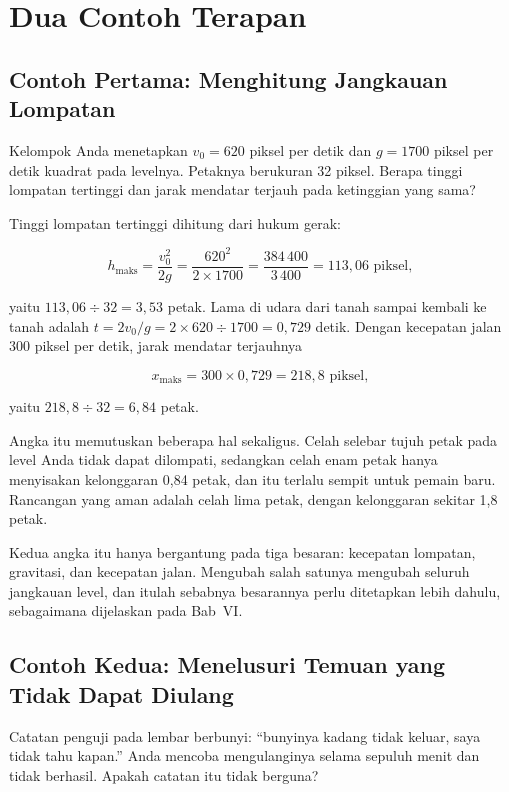 \section{Dua Contoh Terapan}
\label{sec:contoh-bab-16}

\subsection{Contoh Pertama: Menghitung Jangkauan Lompatan}

\begin{contohbox}
Kelompok Anda menetapkan $v_0 = 620$ piksel per detik dan $g = 1700$ piksel
per detik kuadrat pada levelnya. Petaknya berukuran 32 piksel. Berapa tinggi
lompatan tertinggi dan jarak mendatar terjauh pada ketinggian yang sama?
\end{contohbox}

Tinggi lompatan tertinggi dihitung dari hukum gerak:

\[
h_{\text{maks}} = \frac{v_0^2}{2g} = \frac{620^2}{2 \times 1700}
= \frac{384\,400}{3\,400} = 113{,}06 \text{ piksel},
\]

yaitu $113{,}06 \div 32 = 3{,}53$ petak. Lama di udara dari tanah sampai
kembali ke tanah adalah $t = 2v_0 / g = 2 \times 620 \div 1700 = 0{,}729$
detik. Dengan kecepatan jalan 300 piksel per detik, jarak mendatar terjauhnya

\[
x_{\text{maks}} = 300 \times 0{,}729 = 218{,}8 \text{ piksel},
\]

yaitu $218{,}8 \div 32 = 6{,}84$ petak.

Angka itu memutuskan beberapa hal sekaligus. Celah selebar tujuh petak pada
level Anda tidak dapat dilompati, sedangkan celah enam petak hanya menyisakan
kelonggaran 0,84 petak, dan itu terlalu sempit untuk pemain baru. Rancangan
yang aman adalah celah lima petak, dengan kelonggaran sekitar 1,8 petak.

Kedua angka itu hanya bergantung pada tiga besaran:
kecepatan lompatan, gravitasi, dan kecepatan jalan. Mengubah salah satunya
mengubah seluruh jangkauan level, dan itulah sebabnya besarannya perlu
ditetapkan lebih dahulu, sebagaimana dijelaskan pada Bab~VI.

\subsection{Contoh Kedua: Menelusuri Temuan  yang Tidak Dapat Diulang}

\begin{contohbox}
Catatan penguji pada lembar  berbunyi: ``bunyinya kadang
tidak keluar, saya tidak tahu kapan.'' Anda mencoba mengulanginya selama
sepuluh menit dan tidak berhasil. Apakah catatan itu tidak berguna?
\end{contohbox}

